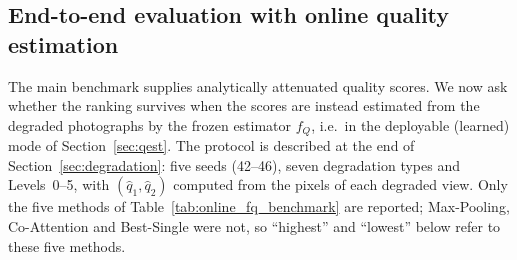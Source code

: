 \documentclass[final,5p,times,twocolumn,authoryear]{elsarticle}
\theoremstyle{plain}
\theoremstyle{remark}
\begin{document}
\subsection{End-to-end evaluation with online quality estimation}
\label{sec:r_online_fq}

The main benchmark supplies analytically attenuated quality scores. We now ask whether the ranking survives when the scores are instead estimated from the degraded photographs by the frozen estimator $f_Q$, i.e.\ in the deployable (learned) mode of Section~\ref{sec:qest}. The protocol is described at the end of Section~\ref{sec:degradation}: five seeds (42--46), seven degradation types and Levels~0--5, with $(\hat q_1, \hat q_2)$ computed from the pixels of each degraded view. Only the five methods of Table~\ref{tab:online_fq_benchmark} are reported; Max-Pooling, Co-Attention and Best-Single were not, so ``highest'' and ``lowest'' below refer to these five methods.
\end{document}
